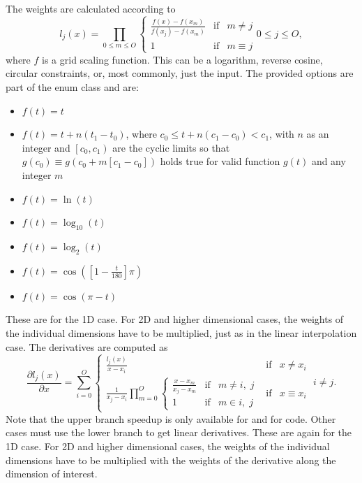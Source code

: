 The weights are calculated according to 
\begin{equation}
 l_j(x) = \prod_{0 \leq m \leq O} \left\{
 \begin{array}{lcr}
 \frac{f(x) - f(x _m)}{f(x_j) - f(x_m)} & \mathrm{if} & m \neq j \\[5pt]
 1 & \mathrm{if} & m \equiv j
 \end{array}
 \right. 0 \leq j \leq O, 
\end{equation}
where $f$ is a grid scaling function.  This can be a logarithm, reverse cosine,
circular constraints, or, most commonly, just the input.  The provided options
are part of the  enum class and are:
\begin{itemize}
 \item[\shortcode{Linear}] $f\left(t\right) = t$
 \item[\shortcode{Cyclic}] $f\left(t\right) = t + n\left(t_1 - t_0\right)$,
                           where $c_0 \leq t + n\left(c_1 - c_0\right) < c_1$,
                           with $n$ as an integer and $\left[c_0, c_1\right)$
                           are the cyclic limits so that
                           $g\left(c_0\right) \equiv g\left(c_0 + m\left[c_1-c_0\right]\right)$
                           holds true for valid function $g(t)$ and any integer $m$
 \item[\shortcode{Log}] $f\left(t\right) = \ln\left(t\right)$
 \item[\shortcode{Log10}] $f\left(t\right) = \log_{10}\left(t\right)$
 \item[\shortcode{Log2}] $f\left(t\right) = \log_2\left(t\right)$
 \item[\shortcode{CosDeg}] $f\left(t\right) = \cos\left(\left[1 - \frac{t}{180}\right]\pi\right)$
 \item[\shortcode{CosRad}] $f\left(t\right) = \cos\left(\pi-t\right)$
\end{itemize}

These are for the 1D case. For 2D and higher dimensional cases, the weights of
the individual dimensions have to be multiplied, just as in the linear
interpolation case.
The derivatives are computed as
\begin{equation}
 \frac{\partial l_j(x)}{\partial x} = \sum_{i=0}^{O}
 \left\{
 \begin{array}{lcr}
  \frac{l_j(x)}{x - x_i} & \mathrm{if} & x \neq x_i \\
  \frac{1}{x_j - x_i} \prod_{m=0}^O
  \left\{
  \begin{array}{lcr}
   \frac{x - x_m}{x_j - x_m} & \mathrm{if} & m \neq i,\; j \\
   1 & \mathrm{if} & m \in i,\; j
  \end{array} \right. & \mathrm{if} & x \equiv x_i
 \end{array}
 \right. \; i \neq j.
\end{equation}
Note that the upper branch speedup is only available for 
 and for  code.
Other cases must use the lower branch to get linear derivatives.
These are again for the 1D case. For 2D and higher dimensional cases, the weights of
the individual dimensions have to be multiplied with the weights of the derivative
along the dimension of interest.

